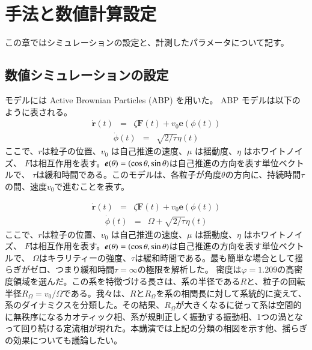 \documentclass[/Users/ikedahajime/GitHub/reserch/master_report/thesis]{subfiles}
\begin{document}
\chapter{手法と数値計算設定}
この章ではシミュレーションの設定と、計測したパラメータについて記す。
\section{数値シミュレーションの設定}
モデルには Active Brownian Particles (ABP)\cite{filyAthermalPhaseSeparation2012} を用いた。 ABP モデルは以下のように表される。
\begin{eqnarray}
    \dot{\bm{r}}(t) &=& \zeta \bm{F}(t)+v_0 \bm{e}(\phi (t))
\end{eqnarray}
\begin{eqnarray}
    \dot{\phi }(t) &=& \sqrt{2/\tau}\eta (t)
\end{eqnarray}
ここで、\mbox{\boldmath$r$}は粒子の位置、$v_0$ は自己推進の速度、$\mu$ は揺動度、$\eta$ はホワイトノイズ、
\mbox{\boldmath$F$}は相互作用を表す。$\mbox{\boldmath$e$}(\theta)=(\cos\theta,\sin \theta)$は自己推進の方向を表す単位ベクトルで、
$\tau$は緩和時間である。このモデルは、各粒子が角度$\theta$の方向に、持続時間$\tau$の間、速度$v_0$で進むことを表す。

\begin{eqnarray}
    \dot{\bm{r}}(t) &=& \zeta \bm{F}(t)+v_0 \bm{e}(\phi (t))
\end{eqnarray}
\begin{eqnarray}
    \dot{\phi }(t) &=& \Omega + \sqrt{2/\tau}\eta (t)
\end{eqnarray}
ここで、\mbox{\boldmath$r$}は粒子の位置、$v_0$ は自己推進の速度、$\mu$ は揺動度、$\eta$ はホワイトノイズ、
\mbox{\boldmath$F$}は相互作用を表す。$\mbox{\boldmath$e$}(\theta)=(\cos\theta,\sin \theta)$は自己推進の方向を表す単位ベクトルで、
$\Omega$はキラリティーの強度、$\tau$は緩和時間である。最も簡単な場合として揺らぎがゼロ、つまり緩和時間$\tau=\infty$の極限を解析した。
密度は$\varphi=1.209$の高密度領域を選んだ。この系を特徴づける長さは、系の半径である$R$と、粒子の回転半径$R_{\Omega}=v_0/\Omega$である。我々は、$R$と$R_{\Omega}$を系の相関長に対して系統的に変えて、系のダイナミクスを分類した。その結果、$R_{\Omega}$が大きくなるに従って系は空間的に無秩序になるカオティック相、系が規則正しく振動する振動相、1つの渦となって回り続ける定流相が現れた。本講演では上記の分類の相図を示す他、揺らぎの効果についても議論したい。

\ifSubfilesClassLoaded{
    \printbibliography[title=参考文献]
    }{}
\end{document}
